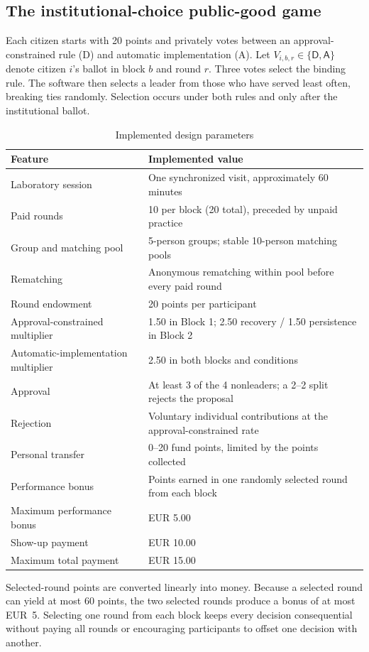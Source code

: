 \documentclass[11pt,a4paper]{article}
\newcommand{\Dproc}{\textsf{D}}
\newcommand{\Aproc}{\textsf{A}}
\begin{document}
\subsection{The institutional-choice public-good game}

Each citizen starts with 20 points and privately votes between an approval-constrained rule (\Dproc) and automatic implementation (\Aproc). Let \(V_{i,b,r}\in\{\Dproc,\Aproc\}\) denote citizen \(i\)'s ballot in block \(b\) and round \(r\). Three votes select the binding rule. The software then selects a leader from those who have served least often, breaking ties randomly. Selection occurs under both rules and only after the institutional ballot.

\begin{table}[H]
\centering
\caption{Implemented design parameters}
\label{tab:parameters}
\begin{threeparttable}
\begin{tabularx}{\textwidth}{>{\raggedright\arraybackslash}p{} X}
\toprule
Feature & Implemented value \\
\midrule
Laboratory session & One synchronized visit, approximately 60 minutes \\
Paid rounds & 10 per block (20 total), preceded by unpaid practice \\
Group and matching pool & 5-person groups; stable 10-person matching pools \\
Rematching & Anonymous rematching within pool before every paid round \\
Round endowment & 20 points per participant \\
Approval-constrained multiplier & 1.50 in Block 1; 2.50 recovery / 1.50 persistence in Block 2 \\
Automatic-implementation multiplier & 2.50 in both blocks and conditions \\
Approval & At least 3 of the 4 nonleaders; a 2--2 split rejects the proposal \\
Rejection & Voluntary individual contributions at the approval-constrained rate \\
Personal transfer & 0--20 fund points, limited by the points collected \\
Performance bonus & Points earned in one randomly selected round from each block \\
Maximum performance bonus & EUR 5.00 \\
Show-up payment & EUR 10.00 \\
Maximum total payment & EUR 15.00 \\
\bottomrule
\end{tabularx}
\begin{tablenotes}[flushleft]\footnotesize
\item Selected-round points are converted linearly into money. Because a selected round can yield at most 60 points, the two selected rounds produce a bonus of at most EUR~5. Selecting one round from each block keeps every decision consequential without paying all rounds or encouraging participants to offset one decision with another.
\end{tablenotes}
\end{threeparttable}
\end{table}
\end{document}
